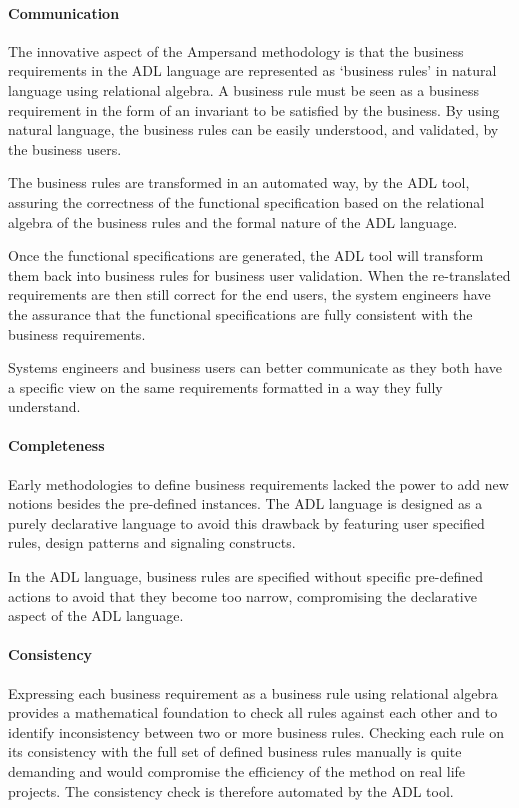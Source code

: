 \paragraph{Communication}

The innovative aspect of the Ampersand methodology is that the business requirements in the ADL language are represented as `business rules' in natural language using relational algebra. 
A business rule must be seen as a business requirement in the form of an invariant to be satisfied by the business.
By using natural language, the business rules can be easily understood, and validated, by the business users.

The business rules are transformed in an automated way, by the ADL tool, assuring the correctness of the functional specification based on the relational algebra of the business rules and the formal nature of the ADL language.

Once the functional specifications are generated, the ADL tool will transform them back into business rules for business user validation. 
When the re-translated requirements are then still correct for the end users, the system engineers have the assurance that the functional specifications are fully consistent with the business requirements. 

Systems engineers and business users can better communicate as they both have a specific view on the same requirements formatted in a way they fully understand.

\paragraph{Completeness}
Early methodologies to define business requirements lacked the power to add new notions besides the pre-defined instances. 
The ADL language is designed as a purely declarative language to avoid this drawback by featuring user specified rules, design patterns and signaling constructs. 

In the ADL language, business rules are specified without specific pre-defined actions to avoid that they become too narrow, compromising the declarative aspect of the ADL language.

\paragraph{Consistency}
Expressing each business requirement as a business rule using relational algebra provides a mathematical foundation to check all rules against each other and to identify inconsistency between two or more business rules. 
Checking each rule on its consistency with the full set of defined business rules manually is quite demanding and would compromise the efficiency of the method on real life projects. 
The consistency check is therefore automated by the ADL tool.

